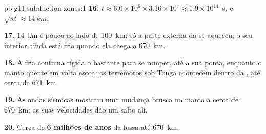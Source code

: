 \begin{solution}{pb:g11:subduction-zones:1}
\textbf{16.} $t \approx 6.0 \times 10^6 \times 3.16 \times 10^7 \approx
1.9 \times 10^{14}$~s, e $\sqrt{\kappa t} \approx \qty{14}{km}$.

\textbf{17.} \qty{14}{km} é pouco ao lado de \qty{100}{km}: só a parte
externa da  se aqueceu; o seu interior ainda está frio quando ela chega
a \qty{670}{km}.

\textbf{18.} A  fria continua rígida o bastante para se romper, até a
sua ponta, enquanto o manto quente em volta escoa: os terremotos sob Tonga
acontecem dentro da , até cerca de \qty{671}{km}.

\textbf{19.} As ondas sísmicas mostram uma mudança brusca no manto a cerca
de \qty{670}{km}: as suas velocidades dão um salto ali.

\textbf{20.} Cerca de \textbf{6 milhões de anos} da fossa até
\qty{670}{km}.
\end{solution}
